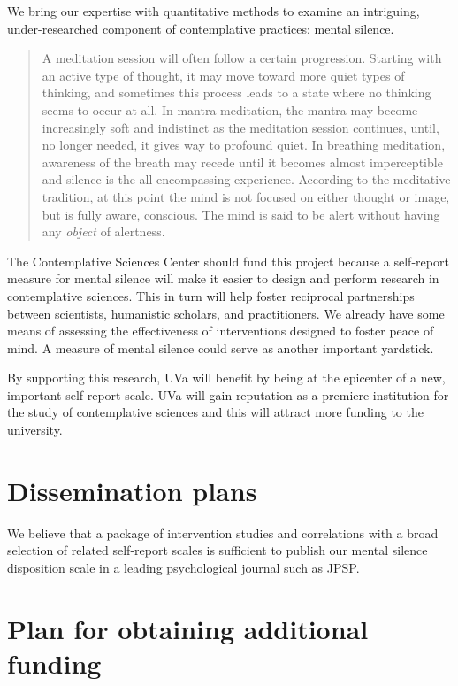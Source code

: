 \documentclass[12pt]{article}
\begin{document}
We bring our expertise with quantitative methods to examine
an intriguing, under-researched component of contemplative practices:
mental silence.

\begin{quotation}
\noindent A meditation session will often follow a certain progression. Starting
with an active type of thought, it may move toward more quiet types of
thinking, and sometimes this process leads to a state where no
thinking seems to occur at all. In mantra meditation, the mantra may
become increasingly soft and indistinct as the meditation session
continues, until, no longer needed, it gives way to profound quiet. In
breathing meditation, awareness of the breath may recede until it
becomes almost imperceptible and silence is the all-encompassing
experience.  According to the meditative tradition, at this point the
mind is not focused on either thought or image, but is fully aware,
conscious. The mind is said to be alert without having any
\emph{object} of alertness.
\cite[p.~91]{carrington1977}
\end{quotation}

The Contemplative Sciences Center should fund this project because
a self-report measure for mental silence will make it easier to design
and perform research in contemplative sciences.
This in turn will help foster reciprocal
partnerships between scientists, humanistic scholars, and practitioners.
We already have some means of assessing the effectiveness of interventions
designed to foster peace of mind.
A measure of mental silence could serve as another important yardstick.

By supporting this research, UVa will benefit by being at the
epicenter of a new, important self-report scale. UVa will gain reputation as a
premiere institution for the study of contemplative sciences and this
will attract more funding to the university.

\section{Dissemination plans}

We believe that a package of intervention studies and
correlations with a broad selection of related self-report scales is sufficient to
publish our mental silence disposition scale in a leading
psychological journal such as JPSP.

\section{Plan for obtaining additional funding}
\end{document}
